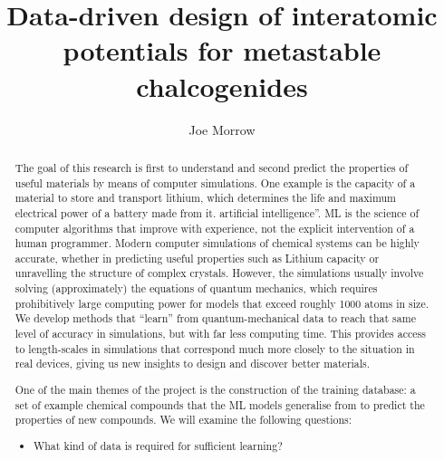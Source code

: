 \documentclass[12pt,a4paper,twoside,nobind]{ociamthesis}
\title{Data-driven design of interatomic potentials for metastable chalcogenides}
\author{Joe Morrow}
\begin{document}
\setlength{\textbaselineskip}{26pt}
\setlength{\frontmatterbaselineskip}{17pt plus1pt minus1pt}
\setlength{\baselineskip}{\textbaselineskip}
\setlength{\baselineskip}{\singlebaselineskip}
%
\setcounter{secnumdepth}{2}
\setcounter{tocdepth}{2}
%
\begin{romanpages}
%
\maketitle
%
%     
%
\begin{abstract}
The goal of this research is first to understand and second predict the properties
of useful materials by means of computer simulations. One example is the capacity
of a material to store and transport lithium, which determines
the life and maximum electrical power of a battery made from it.
artificial intelligence''. 
ML is the science of computer algorithms that
improve with experience, not the explicit intervention of a human programmer.
Modern computer simulations of chemical systems can be highly accurate, whether
in predicting useful properties such as Lithium capacity or unravelling the structure of
complex crystals. However, the simulations usually involve solving (approximately)
the equations of quantum mechanics, which requires prohibitively large computing
power for models that exceed roughly 1000 atoms in size. We develop methods
that ``learn'' from quantum-mechanical data to reach that same level of accuracy
in simulations, but with far less computing time. This provides
access to length-scales in simulations that correspond much more
closely to the situation in real devices, giving us new insights to
design and discover better materials.

One of the main themes of the project is the construction of the training
database: a set of example chemical compounds that the ML models
generalise from to predict the properties of new compounds. We will examine
the following questions:

\begin{itemize}
\item What kind of data is required for sufficient learning? 


\end{itemize}
\end{abstract}
\end{romanpages}
\end{document}
